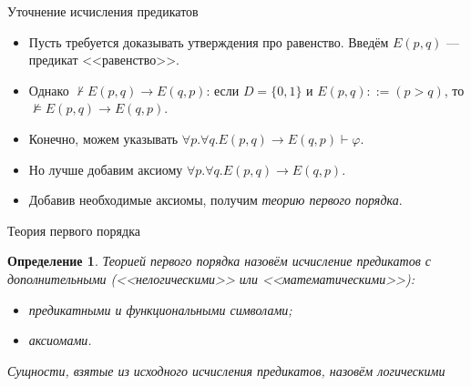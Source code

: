 \documentclass[handout]{beamer}
\newtheorem{dfn}{Определение}[section]
\begin{document}
\newcommand\doubleplus{+\kern-1.3ex+\kern0.8ex}
\newcommand\mdoubleplus{\ensuremath{\mathbin{+\mkern-10mu+}}}

\begin{frame}{Уточнение исчисления предикатов}
\begin{itemize}
\item Пусть требуется доказывать утверждения про равенство. Введём $E(p,q)$ --- предикат <<равенство>>.\pause
\item Однако $\not\vdash E(p,q)\to E(q,p)$: если $D = \{0,1\}$ и $E(p,q) ::= (p>q)$,
то $\not\models E(p,q)\to E(q,p)$.\pause
\item Конечно, можем указывать $\forall p.\forall q.E(p,q)\to E(q,p) \vdash \varphi$.\pause
\item Но лучше добавим аксиому $\forall p.\forall q.E(p,q)\to E(q,p)$.\pause
\item Добавив необходимые аксиомы, получим \emph{теорию первого порядка}.
\end{itemize}
\end{frame}

\begin{frame}{Теория первого порядка}
\begin{dfn}
Теорией первого порядка назовём исчисление предикатов с дополнительными (<<нелогическими>>
или <<математическими>>):
\begin{itemize}
\item предикатными и функциональными символами;
\item аксиомами.
\end{itemize}

Сущности, взятые из исходного исчисления предикатов, назовём \emph{логическими}
\end{dfn}
\end{frame}
\end{document}
